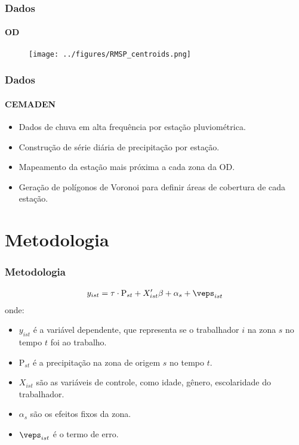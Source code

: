 \begin{frame}[plain]
    \frametitle{Dados}
    \framesubtitle{OD}
    \begin{figure}[H]
        \centering
        \texttt{[image: ../figures/RMSP\_centroids.png]}
        \label{fig:od_centroids}
    \end{figure} 
\end{frame}



\begin{frame}
    \frametitle{Dados}
    \framesubtitle{CEMADEN}
    \begin{itemize}
    \item Dados de chuva em alta frequência por estação pluviométrica.
    \item Construção de série diária de precipitação por estação.
    \item Mapeamento da estação mais próxima a cada zona da OD.
    \item Geração de polígonos de Voronoi para definir áreas de cobertura de cada estação.
    \end{itemize}
\end{frame}

\section{Metodologia}
\begin{frame}[plain]
    \frametitle{Metodologia}
    \begin{align*}
    y_{ist} &= \tau \cdot \text{P}_{st} + X_{ist}'\beta + \alpha_{s} + \veps_{ist} \\ 
    \end{align*}
    onde:
    \begin{itemize}
        \item $y_{ist}$ é a variável dependente, que representa se o trabalhador $i$ na zona $s$ no tempo $t$ foi ao trabalho.
        \item $\text{P}_{st}$ é a precipitação na zona de origem $s$ no tempo $t$.
        \item $X_{ist}$ são as variáveis de controle, como idade, gênero, escolaridade do trabalhador.
        \item $\alpha_{s}$ são os efeitos fixos da zona.
        \item $\veps_{ist}$ é o termo de erro.
    \end{itemize}
\end{frame}

